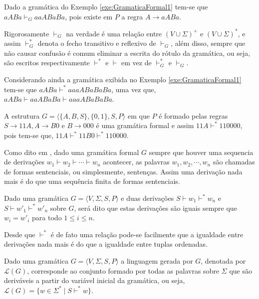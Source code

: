 \begin{exemplo}
	Dado a gramática do Exemplo \ref{exe:GramaticaFormal1} tem-se que $aABa \vdash_G aaABaBa$, pois existe em $P$ a regra $A \rightarrow aABa$.
\end{exemplo}

Rigorosamente $\vdash_G$ na verdade é uma relação entre $(V \cup \Sigma)^+$ e $(V \cup \Sigma)^*$, e assim $\vdash_G^*$ denota o fecho transitivo e reflexivo de  $\vdash_G$, além disso, sempre que não causar confusão é comum eliminar a escrita do rótulo da gramática, ou seja, são escritos respectivamente $\vdash^*$ e $\vdash$ em vez de $\vdash_G^*$ e $\vdash_G$.

\begin{exemplo}
	Considerando ainda a gramática exibida no Exemplo \ref{exe:GramaticaFormal1} tem-se que $aABa \vdash^* aaaABaBaBa$, uma vez que, $aABa \vdash aaABaBa \vdash aaaABaBaBa$.
\end{exemplo}

\begin{exemplo}\label{exe:GramaticaFormal2}
	A estrutura $G = \langle \{A, B, S\}, \{0,1\}, S, P \rangle$ em que $P$ é formado pelas regras $S \rightarrow 11A, A \rightarrow B0$ e $B \rightarrow 000$ é uma gramática formal e assim $11A \vdash^* 110000$, pois tem-se que, $11A \vdash^* 11B0 \vdash^* 110000$.
\end{exemplo}

Como dito em \cite{benjaLivro2010}, dado uma gramática formal $G$ sempre que houver uma sequencia de derivações $w_1 \vdash w_2 \vdash \cdots \vdash w_n$ acontecer, as palavras $w_1, w_2, \cdots, w_n$ são chamadas de formas sentenciais, ou simplesmente, sentenças. Assim uma derivação nada mais é do que uma sequência finita de formas sentenciais.

\begin{definicao}\label{def:IgualdadeDerivacaoGramatica}
	Dado uma gramática $G = \langle V, \Sigma, S, P \rangle$ e duas derivações $S \vdash w_1 \vdash^* w_n$ e $S \vdash w'_1 \vdash^* w'_n$ sobre $G$, será dito que estas derivações são iguais sempre que $w_i = w'_i$ para todo $1 \leq i \leq n$.
\end{definicao}

Desde que $\vdash^*$ é de fato uma relação pode-se facilmente que a igualdade entre derivações nada mais é do que a igualdade entre tuplas ordenadas.

\begin{definicao}\label{def:LinaugemGramatica}
	Dado uma gramática $G = \langle V, \Sigma, S, P \rangle$ a linguagem gerada por $G$, denotada por $\mathcal{L}(G)$, corresponde ao conjunto formado por todas as palavras sobre $\Sigma$ que são deriváveis a partir do variável inicial da gramática, ou seja, $\mathcal{L}(G) = \{w \in \Sigma^* \mid S \vdash^* w\}$.
\end{definicao}

